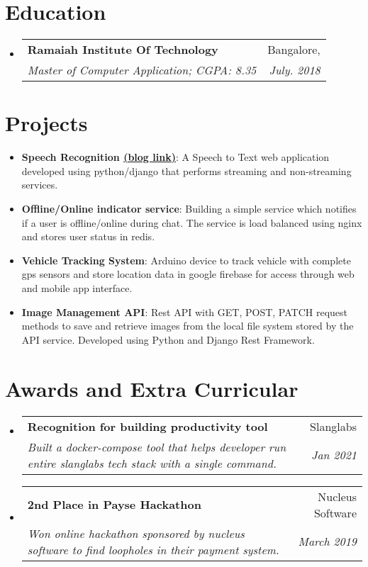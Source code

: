 \documentclass[letterpaper,11pt]{article}
\makeatletter
\newcommand{\resumeItem}[2]{
  \item\small{
    \textbf{#1}{: #2 \vspace{-2pt}}
  }
}
\newcommand{\resumeSubheading}[4]{
  \vspace{-1pt}\item
    \begin{tabular*}{0.97\textwidth}{l@{\extracolsep{\fill}}r}
      \textbf{#1} & #2 \\
      \textit{\small#3} & \textit{\small #4} \\
    \end{tabular*}\vspace{-5pt}
}
\newcommand{\resumeSubItem}[2]{\resumeItem{#1}{#2}\vspace{-4pt}}
\newcommand{\resumeSubHeadingListStart}{\begin{itemize}[leftmargin=*]}
\newcommand{\resumeSubHeadingListEnd}{\end{itemize}}
\makeatother
\begin{document}
 
\section{Education}
  \resumeSubHeadingListStart
    \resumeSubheading
        {Ramaiah Institute Of Technology}{Bangalore,}
        {Master of Computer Application;  CGPA: 8.35}{July. 2018}
  \resumeSubHeadingListEnd


\section{Projects}
  \resumeSubHeadingListStart
      \resumeSubItem{Speech Recognition \href{https://medium.com/@im_mohsin/speech-to-text-in-python-c344725b55a9}{\underline{(blog link)}}}
      {A Speech to Text web application developed using python/django that  performs streaming and non-streaming services.}
    \resumeSubItem{Offline/Online indicator service}
      {Building a simple service which notifies if a user is offline/online during chat. The service is load balanced using nginx and stores user status in redis.}
    \resumeSubItem{Vehicle Tracking System}
      {Arduino device to track vehicle with complete gps sensors and store location data in google firebase for access through web and mobile app interface.}
    \resumeSubItem{Image Management API}
      {Rest API with GET, POST, PATCH request methods to save and retrieve images from the local file system stored by the API service. Developed using Python and Django Rest Framework.}
  \resumeSubHeadingListEnd


\section{Awards and Extra Curricular}
  \resumeSubHeadingListStart
    \resumeSubheading
        {Recognition for building productivity tool}{Slanglabs}
        {Built a docker-compose tool that helps developer run entire slanglabs tech stack with a single command.}{Jan 2021}
    \resumeSubheading
        {2nd Place in Payse Hackathon}{Nucleus Software}
        {Won online hackathon sponsored by nucleus software to find loopholes in their payment system.}{March 2019}
  \resumeSubHeadingListEnd
\end{document}
